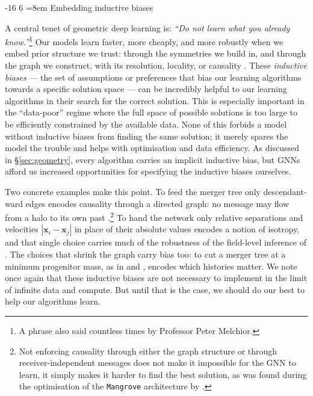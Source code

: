 \documentclass[graybox, envcountchap]{Template/svmult}
\makeatletter
\renewcommand\subsubsection{\@startsection{subsubsection}{3}{\z@}%
                       {-16\p@}%
                       {6\p@}%
                       {\normalfont\normalsize\subsubsecstyle
                        \rightskip=\z@ \@plus 8em\pretolerance=10000 }}
\makeatother
\begin{document}
\subsubsection{Embedding inductive biases}
\label{subsec:bp-bias}

A central tenet of geometric deep learning is: \textit{``Do not learn what you already know.''}\footnote{A phrase also said countless times by Professor Peter Melchior.} Our models learn faster, more cheaply, and more robustly when we embed prior structure we trust: through the symmetries we build in, and through the graph we construct, with its resolution, locality, or causality \citep{Jespersen2022_mangrove, Chuang2024_mergertree_GNN, Wu2024_galaxyhalo_environment}. These \textit{inductive biases} --- the set of assumptions or preferences that bias our learning algorithms towards a specific solution space --- can be incredibly helpful to our learning algorithms in their search for the correct solution. This is especially important in the ``data-poor'' regime where the full space of possible solutions is too large to be efficiently constrained by the available data. None of this forbids a model without inductive biases from finding the same solution; it merely spares the model the trouble and helps with optimisation and data efficiency. As discussed in \S\ref{sec:geometry}, every algorithm carries an implicit inductive bias, but GNNs afford us increased opportunities for specifying the inductive biases ourselves. 

Two concrete examples make this point. To feed the merger tree only descendant-ward edges encodes causality through a directed graph: no message may flow from a halo to its own past \citep{Jespersen2022_mangrove}.\footnote{Not enforcing causality through either the graph structure or through receiver-independent messages does not make it impossible for the GNN to learn, it simply makes it harder to find the best solution, as was found during the optimisation of the \texttt{Mangrove} architecture by \citet{Jespersen2022_mangrove}.} To hand the network only relative separations and velocities $|\mathbf{x}_i - \mathbf{x}_j|$ in place of their absolute values encodes a notion of isotropy, and that single choice carries much of the robustness of the field-level inference of \citet{deSanti2023_fieldlevel_LFI}. The choices that shrink the graph carry bias too: to cut a merger tree at a minimum progenitor mass, as in \citet{Jespersen2022_mangrove} and \citet{Chuang2024_mergertree_GNN}, encodes which histories matter. We note once again that these inductive biases are not necessary to implement in the limit of infinite data and compute. But until that is the case, we should do our best to help our algorithms learn.
\end{document}
